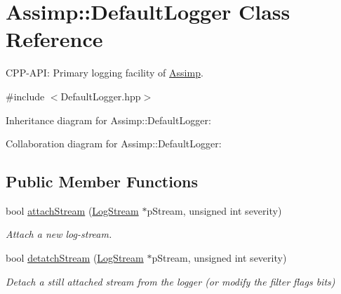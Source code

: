 \hypertarget{class_assimp_1_1_default_logger}{\section{Assimp\-:\-:Default\-Logger Class Reference}
\label{class_assimp_1_1_default_logger}
}


C\-P\-P-\/\-A\-P\-I\-: Primary logging facility of \hyperlink{namespace_assimp}{Assimp}.  




{\ttfamily \#include $<$Default\-Logger.\-hpp$>$}



Inheritance diagram for Assimp\-:\-:Default\-Logger\-:


Collaboration diagram for Assimp\-:\-:Default\-Logger\-:
\subsection*{Public Member Functions}
\begin{DoxyCompactItemize}
\item 
bool \hyperlink{class_assimp_1_1_default_logger_abc0ca7a337f8c3e38eca0eb45bb1ccf0}{attach\-Stream} (\hyperlink{class_assimp_1_1_log_stream}{Log\-Stream} $\ast$p\-Stream, unsigned int severity)
\begin{DoxyCompactList}\small\item\em Attach a new log-\/stream. \end{DoxyCompactList}\item 
bool \hyperlink{class_assimp_1_1_default_logger_a2615f1d1624f1d742d0cf2dd4a5cccc8}{detatch\-Stream} (\hyperlink{class_assimp_1_1_log_stream}{Log\-Stream} $\ast$p\-Stream, unsigned int severity)
\begin{DoxyCompactList}\small\item\em Detach a still attached stream from the logger (or modify the filter flags bits) \end{DoxyCompactList}\end{DoxyCompactItemize}
